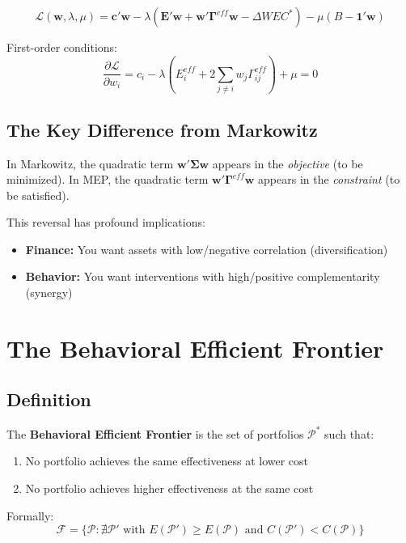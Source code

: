\begin{equation}
\mathcal{L}(\mathbf{w}, \lambda, \mu) = \mathbf{c}'\mathbf{w}
- \lambda \left( \mathbf{E}'\mathbf{w} + \mathbf{w}'\boldsymbol{\Gamma}^{eff}\mathbf{w} - \Delta WEC^* \right)
- \mu \left( B - \mathbf{1}'\mathbf{w} \right)
\end{equation}

First-order conditions:
\begin{equation}
\frac{\partial \mathcal{L}}{\partial w_i} = c_i - \lambda \left( E_i^{eff} + 2 \sum_{j \neq i} w_j \Gamma^{eff}_{ij} \right) + \mu = 0
\label{eq:foc}
\end{equation}

\subsection{The Key Difference from Markowitz}

In Markowitz, the quadratic term $\mathbf{w}'\boldsymbol{\Sigma}\mathbf{w}$ appears in the
\textit{objective} (to be minimized). In MEP, the quadratic term
$\mathbf{w}'\boldsymbol{\Gamma}^{eff}\mathbf{w}$ appears in the \textit{constraint}
(to be satisfied).

This reversal has profound implications:
\begin{itemize}
\item \textbf{Finance:} You want assets with low/negative correlation (diversification)
\item \textbf{Behavior:} You want interventions with high/positive complementarity (synergy)
\end{itemize}


\section{The Behavioral Efficient Frontier}
\label{sec:mep-frontier}

\subsection{Definition}

\begin{definition}
\label{def:frontier}
The \textbf{Behavioral Efficient Frontier} is the set of portfolios $\mathcal{P}^*$
such that:
\begin{enumerate}
\item No portfolio achieves the same effectiveness at lower cost
\item No portfolio achieves higher effectiveness at the same cost
\end{enumerate}
Formally:
\begin{equation}
\mathcal{F} = \{ \mathcal{P} : \nexists \mathcal{P}' \text{ with } E(\mathcal{P}') \geq E(\mathcal{P}) \text{ and } C(\mathcal{P}') < C(\mathcal{P}) \}
\end{equation}
\end{definition}

